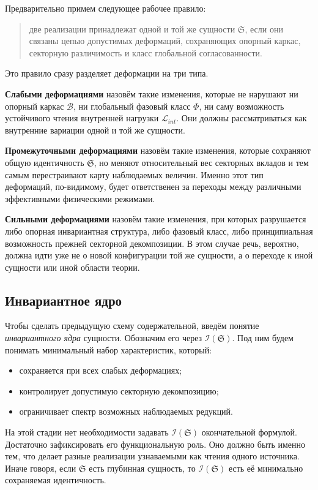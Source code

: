 \documentclass[12pt,a4paper]{article}
\begin{document}
Предварительно примем следующее рабочее правило:
\begin{quote}
две реализации принадлежат одной и той же сущности \(\mathfrak{S}\), если они связаны цепью допустимых деформаций, сохраняющих опорный каркас, секторную различимость и класс глобальной согласованности.
\end{quote}

Это правило сразу разделяет деформации на три типа.

\textbf{Слабыми деформациями} назовём такие изменения, которые не нарушают ни опорный каркас \(\mathcal{B}\), ни глобальный фазовый класс \(\Phi\), ни саму возможность устойчивого чтения внутренней нагрузки \(\mathcal{L}_{int}\). Они должны рассматриваться как внутренние вариации одной и той же сущности.

\textbf{Промежуточными деформациями} назовём такие изменения, которые сохраняют общую идентичность \(\mathfrak{S}\), но меняют относительный вес секторных вкладов и тем самым перестраивают карту наблюдаемых величин. Именно этот тип деформаций, по-видимому, будет ответственен за переходы между различными эффективными физическими режимами.

\textbf{Сильными деформациями} назовём такие изменения, при которых разрушается либо опорная инвариантная структура, либо фазовый класс, либо принципиальная возможность прежней секторной декомпозиции. В этом случае речь, вероятно, должна идти уже не о новой конфигурации той же сущности, а о переходе к иной сущности или иной области теории.

\subsection{Инвариантное ядро}

Чтобы сделать предыдущую схему содержательной, введём понятие \textit{инвариантного ядра} сущности. Обозначим его через \(\mathcal{I}(\mathfrak{S})\). Под ним будем понимать минимальный набор характеристик, который:
\begin{itemize}
    \item сохраняется при всех слабых деформациях;
    \item контролирует допустимую секторную декомпозицию;
    \item ограничивает спектр возможных наблюдаемых редукций.
\end{itemize}

На этой стадии нет необходимости задавать \(\mathcal{I}(\mathfrak{S})\) окончательной формулой. Достаточно зафиксировать его функциональную роль. Оно должно быть именно тем, что делает разные реализации узнаваемыми как чтения одного источника. Иначе говоря, если \(\mathfrak{S}\) есть глубинная сущность, то \(\mathcal{I}(\mathfrak{S})\) есть её минимально сохраняемая идентичность.
\end{document}
